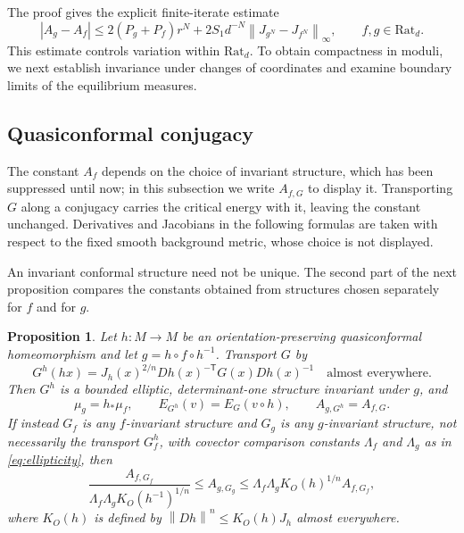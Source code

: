 \documentclass[11pt,reqno]{amsart}
\theoremstyle{plain}
\newtheorem{proposition}[theorem]{Proposition}
\theoremstyle{definition}
\theoremstyle{remark}
\newcommand{\norm}[1]{\left\lVert #1\right\rVert}
\numberwithin{equation}{section}
\begin{document}
The proof gives the explicit finite-iterate estimate
\begin{equation}\label{eq:continuity-modulus}
 |A_g-A_f|\le 2(P_g+P_f)r^N
       +2S_1d^{-N}\norm{J_{g^N}-J_{f^N}}_\infty,
 \qquad f,g\in\mathrm{Rat}_d.
\end{equation}
This estimate controls variation within $\mathrm{Rat}_d$. To obtain compactness in moduli, we next establish invariance under changes of coordinates and examine boundary limits of the equilibrium measures.

\subsection{Quasiconformal conjugacy}

The constant $A_f$ depends on the choice of invariant structure, which has been suppressed until now; in this subsection we write $A_{f,G}$ to display it. Transporting $G$ along a conjugacy carries the critical energy with it, leaving the constant unchanged. Derivatives and Jacobians in the following formulas are taken with respect to the fixed smooth background metric, whose choice is not displayed.

An invariant conformal structure need not be unique. The second part of the next proposition compares the constants obtained from structures chosen separately for $f$ and for $g$.

\begin{proposition}\label{prop:qc-conjugacy}
Let $h\colon M\to M$ be an orientation-preserving quasiconformal homeomorphism and let $g=h\circ f\circ h^{-1}$. Transport $G$ by
\begin{equation}\label{eq:transported-G}
 G^h(hx)=J_h(x)^{2/n}Dh(x)^{-\mathsf T}G(x)Dh(x)^{-1}
 \quad\text{almost everywhere}.
\end{equation}
Then $G^h$ is a bounded elliptic, determinant-one structure invariant under $g$, and
\begin{equation}\label{eq:conjugacy-exact}
 \mu_g=h_*\mu_f,\qquad
 E_{G^h}(v)=E_G(v\circ h),\qquad
 A_{g,G^h}=A_{f,G}.
\end{equation}
If instead $G_f$ is any $f$-invariant structure and $G_g$ is any $g$-invariant structure, not necessarily the transport $G_f^h$, with covector comparison constants $\Lambda_f$ and $\Lambda_g$ as in \eqref{eq:ellipticity}, then
\begin{equation}\label{eq:conjugacy-comparison}
 \frac{A_{f,G_f}}{\Lambda_f\Lambda_g K_O(h^{-1})^{1/n}}
 \le A_{g,G_g}
 \le\Lambda_f\Lambda_g K_O(h)^{1/n}A_{f,G_f},
\end{equation}
where $K_O(h)$ is defined by $\norm{Dh}^n\le K_O(h)J_h$ almost everywhere.
\end{proposition}
\end{document}

